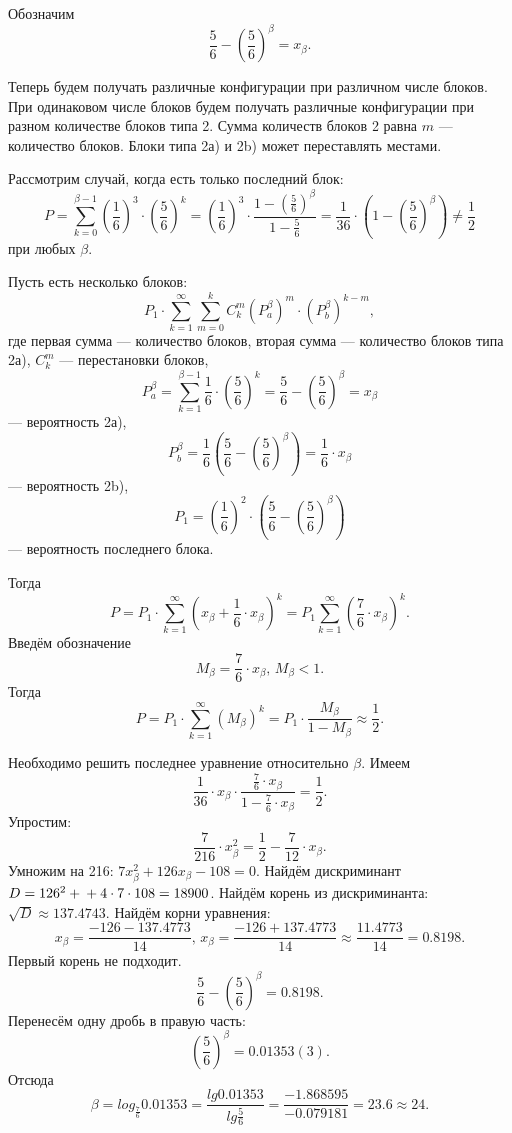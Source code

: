 Обозначим
$$ \frac{5}{6} - \left( \frac{5}{6} \right)^{ \beta } =
x_{ \beta }.$$

Теперь будем получать различные конфигурации при различном числе блоков.
При одинаковом числе блоков будем получать различные конфигурации при разном количестве блоков типа 2.
Сумма количеств блоков 2 равна $m$ --- количество блоков.
Блоки типа 2а) и 2b) может переставлять местами.

Рассмотрим случай, когда есть только последний блок:
$$P =
\sum \limits_{k=0}^{ \beta -1} \left( \frac{1}{6} \right)^3 \cdot \left( \frac{5}{6} \right)^k =
\left( \frac{1}{6} \right)^3 \cdot \frac{1 - \left( \frac{5}{6} \right)^{ \beta }}{1 - \frac{5}{6}} =
\frac{1}{36} \cdot \left( 1 - \left( \frac{5}{6} \right)^{ \beta } \right) \neq
\frac{1}{2}$$
при любых $ \beta $.

Пусть есть несколько блоков:
$$P_1 \cdot \sum \limits_{k=1}^{ \infty } \sum \limits_{m=0}^k C_k^m \left( P_a^{ \beta } \right)^m \cdot \left( P_b^{ \beta } \right)^{k-m},$$
где первая сумма --- количество блоков, вторая сумма --- количество блоков типа 2а), $C_k^m$ --- перестановки блоков,
$$P_a^{ \beta } =
\sum \limits_{k=1}^{ \beta -1} \frac{1}{6} \cdot \left( \frac{5}{6} \right)^k =
\frac{5}{6} - \left( \frac{5}{6} \right)^{ \beta } =
x_{ \beta }$$
--- вероятность 2а),
$$P_b^{ \beta } =
\frac{1}{6} \left( \frac{5}{6} - \left( \frac{5}{6} \right)^{ \beta } \right) =
\frac{1}{6} \cdot x_{ \beta }$$
--- вероятность 2b),
$$P_1 =
\left( \frac{1}{6} \right)^2 \cdot \left( \frac{5}{6} - \left( \frac{5}{6} \right)^{ \beta } \right) $$
--- вероятность последнего блока.

Тогда
$$P =
P_1 \cdot \sum \limits_{k=1}^{ \infty } \left( x_{ \beta } + \frac{1}{6} \cdot x_{ \beta } \right)^k =
P_1 \sum \limits_{k=1}^{ \infty } \left( \frac{7}{6} \cdot x_{ \beta } \right)^k.$$
Введём обозначение
$$M_{ \beta } =
\frac{7}{6} \cdot x_{ \beta }, \,
M_{ \beta} <  1.$$
Тогда
$$P =
P_1 \cdot \sum \limits_{k=1}^{ \infty } \left( M_{ \beta } \right)^k =
P_1 \cdot \frac{M_{ \beta }}{1 - M_{ \beta }} \approx \frac{1}{2}.$$

Необходимо решить последнее уравнение относительно $ \beta $.
Имеем
$$ \frac{1}{36} \cdot x_{ \beta } \cdot \frac{ \frac{7}{6} \cdot x_{ \beta }}{1 - \frac{7}{6} \cdot x_{ \beta }} =
\frac{1}{2}.$$
Упростим:
$$ \frac{7}{216} \cdot x_{ \beta }^2 =
\frac{1}{2} - \frac{7}{12} \cdot x_{ \beta }.$$
Умножим на 216: $7x_{ \beta }^2 + 126x_{ \beta } - 108 = 0$.
Найдём дискриминант $D = 126^2 + \\ + 4 \cdot 7 \cdot 108 = 18900$.
Найдём корень из дискриминанта: $ \sqrt{D} \approx 137.4743$.
Найдём корни уравнения:
$$x_{ \beta } =
\frac{-126-137.4773}{14}, \,
x_{ \beta } =
\frac{-126+137.4773}{14} \approx
\frac{11.4773}{14} =
0.8198.$$
Первый корень не подходит.
$$ \frac{5}{6} - \left( \frac{5}{6} \right)^{ \beta } =
0.8198.$$
Перенесём одну дробь в правую часть:
$$ \left( \frac{5}{6} \right)^{ \beta } =
0.01353 \left( 3 \right).$$
Отсюда
$$ \beta =
log_{ \frac{7}{6}} 0.01353 =
\frac{lg 0.01353}{lg \frac{5}{6}} =
\frac{-1.868595}{-0.079181} =
23.6 \approx
24.$$

